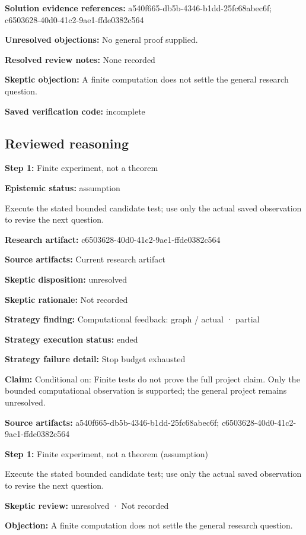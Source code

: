 \documentclass[11pt]{article}
\begin{document}
\textbf{Solution evidence references:} a540f665-db5b-4346-b1dd-25fc68abec6f; c6503628-40d0-41c2-9ae1-ffde0382c564\par
\textbf{Unresolved objections:} No general proof supplied.\par
\textbf{Resolved review notes:} None recorded\par
\textbf{Skeptic objection:} A finite computation does not settle the general research question.\par
\textbf{Saved verification code:} incomplete\par
\subsection{Reviewed reasoning}
\textbf{Step 1:} Finite experiment, not a theorem\par
\textbf{Epistemic status:} assumption\par
Execute the stated bounded candidate test; use only the actual saved observation to revise the next question.\par
\textbf{Research artifact:} c6503628-40d0-41c2-9ae1-ffde0382c564\par
\textbf{Source artifacts:} Current research artifact\par
\textbf{Skeptic disposition:} unresolved\par
\textbf{Skeptic rationale:} Not recorded\par
\textbf{Strategy finding:} Computational feedback: graph / actual · partial\par
\textbf{Strategy execution status:} ended\par
\textbf{Strategy failure detail:} Stop budget exhausted\par
\textbf{Claim:} Conditional on: Finite tests do not prove the full project claim. Only the bounded computational observation is supported; the general project remains unresolved.\par
\textbf{Source artifacts:} a540f665-db5b-4346-b1dd-25fc68abec6f; c6503628-40d0-41c2-9ae1-ffde0382c564\par
\textbf{Step 1:} Finite experiment, not a theorem (assumption)\par
Execute the stated bounded candidate test; use only the actual saved observation to revise the next question.\par
\textbf{Skeptic review:} unresolved · Not recorded\par
\textbf{Objection:} A finite computation does not settle the general research question.\par
\end{document}
